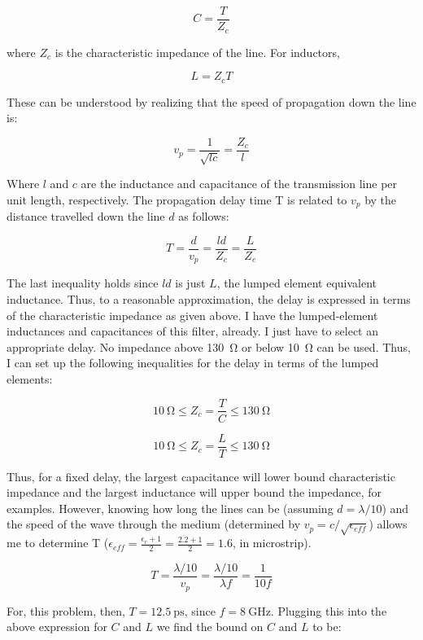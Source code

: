    \[ 
        C = \frac{T}{Z_c} 
    \]
    
    where $Z_c$ is the characteristic impedance of the line. For inductors,

    \[ 
        L =Z_c T
    \]
    
    These can be understood by realizing that the speed of propagation down the
    line is:

    \[ 
        v_p = \frac{1}{\sqrt{lc}} = \frac{Z_c}{l}
    \]
    
    Where $l$ and $c$ are the inductance and capacitance of the transmission
    line per unit length, respectively.  The propagation delay time T is related
    to $v_p$ by the distance travelled down the line $d$ as follows:

    \[ 
        T = \frac{d}{v_p} = \frac{l d}{Z_c} = \frac{L}{Z_c}
    \]
    
    The last inequality holds since $l d$ is just $L$, the lumped element
    equivalent inductance. Thus, to a reasonable approximation, the delay is
    expressed in terms of the characteristic impedance as given above. I have
    the lumped-element inductances and capacitances of this filter, already. I
    just have to select an appropriate delay. No impedance above \SI{130}{\ohm}
    or below \SI{10}{\ohm} can be used. Thus, I can set up the following
    inequalities for the delay in terms of the lumped elements:

    \[
        \SI{10}{\ohm} \le Z_c = \frac{T}{C} \le \SI{130}{\ohm} 
    \]
   
    \[ 
        \SI{10}{\ohm} \le Z_c = \frac{L}{T} \le \SI{130}{\ohm}  
    \]
    
    Thus, for a fixed delay, the largest capacitance will lower bound
    characteristic impedance and the largest inductance will upper bound the
    impedance, for examples. However, knowing how long the lines can be
    (assuming $d = \lambda/10$) and the speed of the wave through the medium
    (determined by $v_p = c / \sqrt{\epsilon_{eff}}$) allows me to determine T ($
    \epsilon_{eff} = \frac{\epsilon_r+1}{2} = \frac{2.2+1}{2} = 1.6$, in
    microstrip).

    \[ 
        T = \frac{\lambda/10}{v_p} = \frac{\lambda/10}{\lambda f} = 
        \frac{1}{10 f}
    \]
    
    For, this problem, then, $T = \SI{12.5}{\pico\second} $, since $ f =
    \SI{8}{\giga\hertz} $. Plugging this into the above expression for $C$ and
    $L$ we find the bound on $C$ and $L$ to be:

